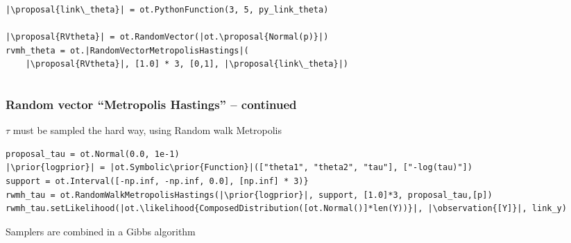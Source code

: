 \documentclass{beamer}
\newcommand{\proposal}[1]{\textcolor{blue}{#1}}
\newcommand{\prior}[1]{\textcolor{red}{#1}}
\newcommand{\likelihood}[1]{\textcolor{green}{#1}}
\newcommand{\observation}[1]{\textcolor{orange}{#1}}
\begin{document}
\begin{frame}[containsverbatim]
\begin{columns}
\begin{column}{0.5\textwidth}
\begin{lstlisting}
|\proposal{link\_theta}| = ot.PythonFunction(3, 5, py_link_theta)

|\proposal{RVtheta}| = ot.RandomVector(|ot.\proposal{Normal(p)}|)
rvmh_theta = ot.|RandomVectorMetropolisHastings|(
    |\proposal{RVtheta}|, [1.0] * 3, [0,1], |\proposal{link\_theta}|)
\end{lstlisting}
    \end{column}
\end{columns}

\end{frame}

\begin{frame}[containsverbatim]
    \frametitle{Random vector ``Metropolis Hastings'' -- continued}
    \begin{block}{$\tau$ must be sampled the hard way, using Random walk Metropolis}
\begin{lstlisting}
proposal_tau = ot.Normal(0.0, 1e-1)
|\prior{logprior}| = |ot.Symbolic\prior{Function}|(["theta1", "theta2", "tau"], ["-log(tau)"])
support = ot.Interval([-np.inf, -np.inf, 0.0], [np.inf] * 3)}
rwmh_tau = ot.RandomWalkMetropolisHastings(|\prior{logprior}|, support, [1.0]*3, proposal_tau,[p])
rwmh_tau.setLikelihood(|ot.\likelihood{ComposedDistribution([ot.Normal()]*len(Y))}|, |\observation{[Y]}|, link_y)
\end{lstlisting}
    \end{block}
\vspace{-0.5cm}
    \begin{block}{Samplers are combined in a Gibbs algorithm}
        \centering
\end{block}
\end{frame}
\end{document}
